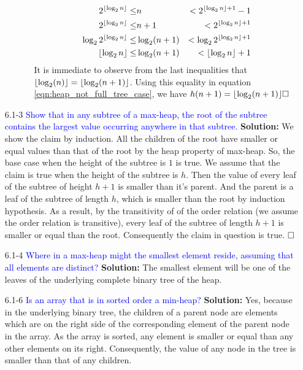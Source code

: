 \documentclass{article}
\DeclarePairedDelimiter\floor{\lfloor}{\rfloor}
\begin{document}
\begin{enumerate}
\begin{enumerate}
\begin{enumerate}
\begin{eqnarray*}
    2^{\floor{\log_2 n}} \leq &n& < 2^{\floor{\log_2 n}+1}-1\\
    2^{\floor{\log_2 n}}\leq &n + 1& < 2^{\floor{\log_2 n}+1}\\
    \log_2 2^{\floor{\log_2 n}}\leq &\log_2(n + 1)& < \log_2 2^{\floor{\log_2 n}+1}\\
    {\floor{\log_2 n}}\leq &\log_2(n + 1)& < \floor{\log_2 n}+1
    \end{eqnarray*}
    It is immediate to observe from the last inequalities that $\floor{\log_2(n)} = \floor{\log_2(n + 1)}$. Using this equality in equation \ref{eqn:heap_not_full_tree_case}, we have $h(n+1) = \floor{\log_2 (n+1)} \hfill \square$
    \end{enumerate}
    \end{enumerate}
    
    \item[6.1-3] \textcolor{blue}{Show that in any subtree of a max-heap, the root of the subtree contains the largest value occurring anywhere in that subtree.}
    \textbf{Solution:} We show the claim by induction. All the children of the root have smaller or equal values than that of the root by the heap property of max-heap. So, the base case when the height of the subtree is $1$ is true. We assume that the claim is true when the height of the subtree is $h$. Then the value of every leaf of the subtree of height $h+1$ is smaller than it's parent. And the parent is a leaf of the subtree of length $h$, which is smaller than the root by induction hypothesis. As a result, by the transitivity of of the order relation (we assume the order relation is transitive), every leaf of the subtree of length $h+1$ is smaller or equal than the root. Consequently the claim in question is true. $\hfill \square$
    
    \item[6.1-4] \textcolor{blue}{Where in a max-heap might the smallest element reside, assuming that all elements are distinct?}
    \textbf{Solution:} The smallest element will be one of the leaves of the underlying complete binary tree of the heap.
    
    \item[6.1-6] \textcolor{blue}{Is an array that is in sorted order a min-heap?}
    \textbf{Solution:} Yes, because in the underlying binary tree, the children of a parent node are elements which are on the right side of the corresponding element of the parent node in the array. As the array is sorted, any element is smaller or equal than any other elements on its right. Consequently, the value of any node in the tree is smaller than that of any children. 
    

\end{enumerate}
\end{document}
